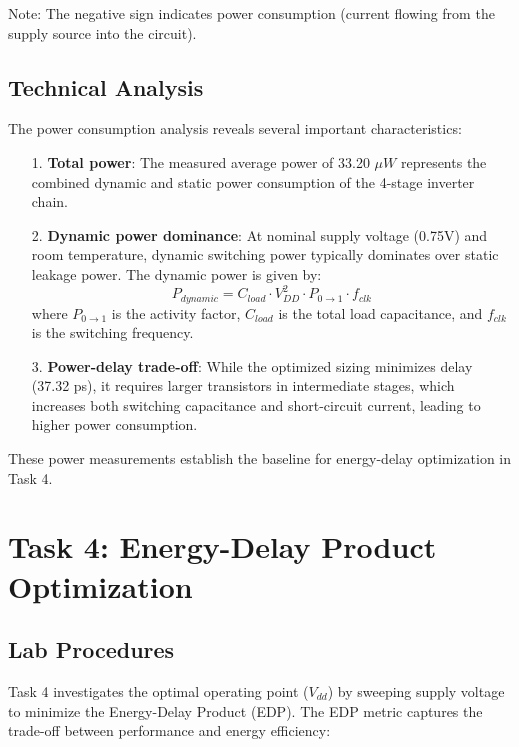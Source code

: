 \documentclass[UTF8,12pt,a4paper]{ctexart}
\begin{document}
Note: The negative sign indicates power consumption (current flowing from the supply source into the circuit).

\subsection{Technical Analysis}

The power consumption analysis reveals several important characteristics:

\begin{itemize}
    \item[1.] \textbf{Total power}: The measured average power of 33.20 $\mu W$ represents the combined dynamic and static power consumption of the 4-stage inverter chain.
    
    \item[2.] \textbf{Dynamic power dominance}: At nominal supply voltage (0.75V) and room temperature, dynamic switching power typically dominates over static leakage power. The dynamic power is given by:
    $$P_{dynamic} = C_{load} \cdot V_{DD}^2 \cdot P_{0 \rightarrow 1} \cdot f_{clk}$$
    where $P_{0 \rightarrow 1}$ is the activity factor, $C_{load}$ is the total load capacitance, and $f_{clk}$ is the switching frequency.
    
    \item[3.] \textbf{Power-delay trade-off}: While the optimized sizing minimizes delay (37.32 ps), it requires larger transistors in intermediate stages, which increases both switching capacitance and short-circuit current, leading to higher power consumption.
\end{itemize}

These power measurements establish the baseline for energy-delay optimization in Task 4.

\newpage
\section{Task 4: Energy-Delay Product Optimization}

\subsection{Lab Procedures}

Task 4 investigates the optimal operating point ($V_{dd}$) by sweeping supply voltage to minimize the Energy-Delay Product (EDP). The EDP metric captures the trade-off between performance and energy efficiency:
\end{document}
